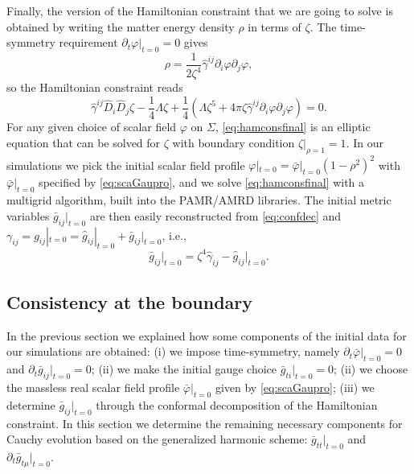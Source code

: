\documentclass[aps,letterpaper,twocolumn,nofootinbib]{revtex4}
\numberwithin{equation}{section}
\begin{document}
Finally, the version of the Hamiltonian constraint that we are going to solve is obtained by writing the matter energy density $\rho$ in terms of $\zeta$. The time-symmetry requirement $\partial_t \varphi\big|_{t=0}=0$ gives
\begin{equation}
\label{eq:mattendens}
\rho=\frac{1}{2\zeta^4}\hat{\gamma}^{ij}\partial_i\varphi\partial_j\varphi,
\end{equation}
so the Hamiltonian constraint reads
\begin{equation}
\label{eq:hamconsfinal}
\hat{\gamma}^{ij}\hat{D}_i \hat{D}_j \zeta-\frac{1}{4}\Lambda\zeta+\frac{1}{4}(\Lambda\zeta^5+4\pi\zeta\hat{\gamma}^{ij}\partial_i\varphi\partial_j\varphi)=0.
\end{equation}
For any given choice of scalar field $\varphi$ on $\Sigma$, \eqref{eq:hamconsfinal} is an elliptic equation that can be solved for $\zeta$ with boundary condition $\zeta|_{\rho=1}=1$. In our simulations we pick the initial scalar field profile $\varphi|_{t=0}=\bar{\varphi}|_{t=0}(1-\rho^2)^2$ with $\bar{\varphi}|_{t=0}$ specified by \eqref{eq:scaGaupro}, and we solve \eqref{eq:hamconsfinal} with a multigrid algorithm, built into the PAMR/AMRD libraries.
The initial metric variables $\bar{g}_{ij}|_{t=0}$ are then easily reconstructed from \eqref{eq:confdec} and $\gamma_{ij}=g_{ij}|_{t=0}=\hat{g}_{ij}|_{t=0}+\bar{g}_{ij}|_{t=0}$, i.e.,
\begin{equation}
\bar{g}_{ij}\big|_{t=0}=\zeta^4\hat{\gamma}_{ij}-\hat{g}_{ij}\big|_{t=0}.
\end{equation}

\subsection{Consistency at the boundary}
\label{sec:consistbound}

In the previous section we explained how some components of the initial data for our simulations are obtained: (i) we impose time-symmetry, namely $\partial_t\bar{\varphi}|_{t=0}=0$ and $\partial_t\bar{g}_{ij}|_{t=0}=0$; (ii) we make the initial gauge choice $\bar{g}_{ti}|_{t=0}=0$; (ii) we choose the massless real scalar field profile $\bar{\varphi}|_{t=0}$ given by \eqref{eq:scaGaupro}; (iii) we determine $\bar{g}_{ij}|_{t=0}$ through the conformal decomposition of the Hamiltonian constraint. In this section we determine the remaining necessary components for Cauchy evolution based on the generalized harmonic scheme: $\bar{g}_{tt}|_{t=0}$ and $\partial_t\bar{g}_{t \mu}|_{t=0}$.
\end{document}
